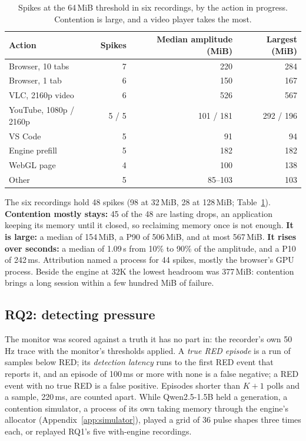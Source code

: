 \documentclass{article}
\begin{document}
\begin{table}[t]
\caption{Spikes at the 64\,MiB threshold in six recordings, by the action in
progress. Contention is large, and a video player takes the most.}
\label{tab:rq1}
\centering
\small
\begin{tabular}{lrrr}
\toprule
Action & Spikes & Median amplitude (MiB) & Largest (MiB) \\
\midrule
Browser, 10 tabs & 7 & 220 & 284 \\
Browser, 1 tab & 6 & 150 & 167 \\
VLC, 2160p video & 6 & 526 & 567 \\
YouTube, 1080p / 2160p & 5 / 5 & 101 / 181 & 292 / 196 \\
VS Code & 5 & 91 & 94 \\
Engine prefill & 5 & 182 & 182 \\
WebGL page & 4 & 100 & 138 \\
Other & 5 & 85--103 & 103 \\
\bottomrule
\end{tabular}
\end{table}

The six recordings hold 48 spikes (98 at 32\,MiB, 28 at 128\,MiB;
Table~\ref{tab:rq1}). \textbf{Contention mostly stays:} 45 of the 48 are lasting
drops, an application keeping its memory until it closed, so reclaiming memory
once is not enough. \textbf{It is large:} a median of 154\,MiB, a P90 of
506\,MiB, and at most 567\,MiB. \textbf{It rises over seconds:} a median of
1.09\,s from 10\% to 90\% of the amplitude, and a P10 of 242\,ms. Attribution
named a process for 44 spikes, mostly the browser's GPU process. Beside the
engine at 32K the lowest headroom was 377\,MiB: contention brings a long
session within a few hundred MiB of failure.

\subsection{RQ2: detecting pressure}
\label{sec:detection}

The monitor was scored against a truth it has no part in: the recorder's own
50\,Hz trace with the monitor's thresholds applied. A \textit{true RED episode}
is a run of samples below RED; its \textit{detection latency} runs to the first
RED event that reports it, and an episode of 100\,ms or more with none is a
false negative; a RED event with no true RED is a false positive. Episodes
shorter than $K+1$ polls and a sample, 220\,ms, are counted apart. While
Qwen2.5-1.5B held a generation, a contention simulator, a process of its own
taking memory through the engine's allocator (Appendix~\ref{app:simulator}),
played a grid of 36 pulse shapes three times each, or replayed RQ1's five
with-engine recordings.
\end{document}
